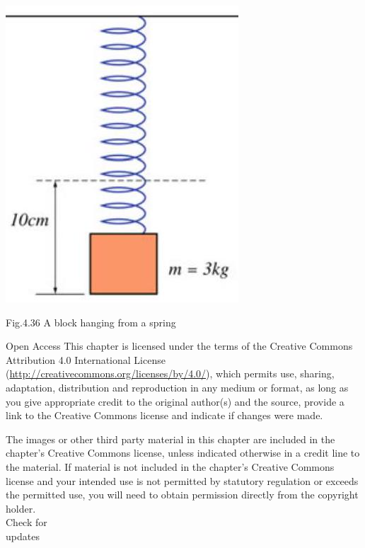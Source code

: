 \documentclass[10pt]{article}
\begin{document}
\begin{center}
\includegraphics[max width=\textwidth]{2024_09_13_db1f357d2aad0a03eb2eg-080(2)}
\end{center}

Fig.4.36 A block hanging from a spring

Open Access This chapter is licensed under the terms of the Creative Commons Attribution 4.0 International License (\href{http://creativecommons.org/licenses/by/4.0/}{http://creativecommons.org/licenses/by/4.0/}), which permits use, sharing, adaptation, distribution and reproduction in any medium or format, as long as you give appropriate credit to the original author(s) and the source, provide a link to the Creative Commons license and indicate if changes were made.

The images or other third party material in this chapter are included in the chapter's Creative Commons license, unless indicated otherwise in a credit line to the material. If material is not included in the chapter's Creative Commons license and your intended use is not permitted by statutory regulation or exceeds the permitted use, you will need to obtain permission directly from the copyright holder.\\
Check for\\
updates
\end{document}
